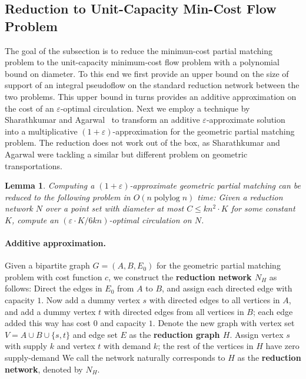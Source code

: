 \documentclass[11pt]{article}
\def\polylog{\mathop{\mathrm{polylog}}}
\def\eps{\varepsilon}
\def\set#1{\{ #1 \}}
\theoremstyle{plain}
\newtheorem{lemma}{Lemma}[section]
\numberwithin{figure}{section}
\def\EMPH#1{\textbf{\boldmath #1}}
\begin{document}


\subsection{Reduction to Unit-Capacity Min-Cost Flow Problem}

The goal of the subsection is to reduce the minimun-cost partial matching problem to the unit-capacity minimum-cost flow problem with a polynomial bound on diameter.
To this end we first provide an upper bound on the size of support of an integral pseudoflow on the standard reduction network between the two problems.  This upper bound in turns provides an additive approximation on the cost of an $\eps$-optimal circulation.
Next we employ a technique by Sharathkumar and Agarwal~\cite{SA12} to transform an additive $\eps$-approximate solution into a multiplicative $(1+\eps)$-approximation for the geometric partial matching problem.  The reduction does not work out of the box, as Sharathkumar and Agarwal were tackling a similar but different problem on geometric transportations.

\begin{lemma}
\label{lemma:cost_scale_approx}
Computing a $(1+\eps)$-approximate geometric partial matching can be reduced to the following problem in $O(n \polylog n)$ time:
Given a reduction network $N$ over a point set with diameter at most $C \le kn^2 \cdot K$ for some constant $K$, compute an $(\eps\cdot K/6kn)$-optimal circulation on $N$.
\end{lemma}


\paragraph{Additive approximation.}
Given a bipartite graph $G = (A,B,E_0)$ for the geometric partial matching problem with cost function $c$, we construct the \EMPH{reduction network $N_H$} as follows:
Direct the edges in $E_0$ from $A$ to $B$, and assign each directed edge with capacity $1$.  Now add a dummy vertex $s$ with directed edges to all vertices in $A$, and add a dummy vertex $t$ with directed edges from all vertices in $B$; each edge added this way has cost $0$ and capacity $1$.
Denote the new graph with vertex set $V = A \cup B \cup \set{s,t}$ and edge set $E$ as the \EMPH{reduction graph $H$}.
Assign vertex $s$ with supply $k$ and vertex $t$ with demand $k$; the rest of the vertices in $H$ have zero supply-demand
We call the network naturally corresponds to $H$ as the \EMPH{reduction network}, denoted by \EMPH{$N_H$}.
\end{document}
